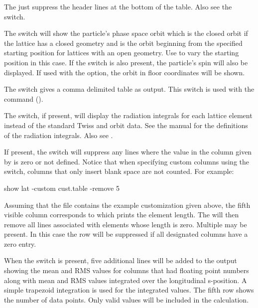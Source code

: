 {{{{{{{{\begin{description}
The  just suppress the header lines at the bottom of the table. Also see the
 switch.
%
\item[-orbit] \Newline
The  switch will show the particle's phase space orbit which is the closed orbit if the
lattice has a closed geometry and is the orbit beginning from the specified starting position for
lattices with an open geometry. Use  to vary the starting position in this
case. If the  switch is also present, the particle's spin will also be displayed. If used
with the  option, the orbit in floor coordinates will be shown.
%
\item[-pipe] \Newline
The  switch gives a comma delimited table as output. This switch is used with the
 command ().
%
\item[-radiation_integrals] \Newline
The  switch, if present, will display the radiation integrals for each
lattice element instead of the standard Twiss and orbit data. See the \bmad manual for the
definitions of the radiation integrals. Also see .
%
\item[-remove_line_if_zero <column \#>] \Newline
If present, the  switch will suppress any lines where the value
in the column given by  is zero or not defined. Notice that when specifying custom
columns using the  switch, columns that only insert blank space are not counted. For
example:
\begin{example}
  show lat -custom cust.table -remove 5
\end{example}
Assuming that the file  contains the example customization given above, the fifth
visible column corresponds to  which prints the element length. The 
will then remove all lines associated with elements whose length is zero. Multiple
 may be present. In this case the row will be suppressed if all designated
columns have a zero entry.
%
\item[-rms] \Newline
When the  switch is present, five additional lines will be added to the output showing the
mean and RMS values for columns that had floating point numbers along with mean and RMS values
integrated over the longitudinal s-position. A simple trapezoid integration is used for the
integrated values. The fifth row shows the number of data points. Only valid values will be included
in the calculation.

\end{description}}}}}}}}}
